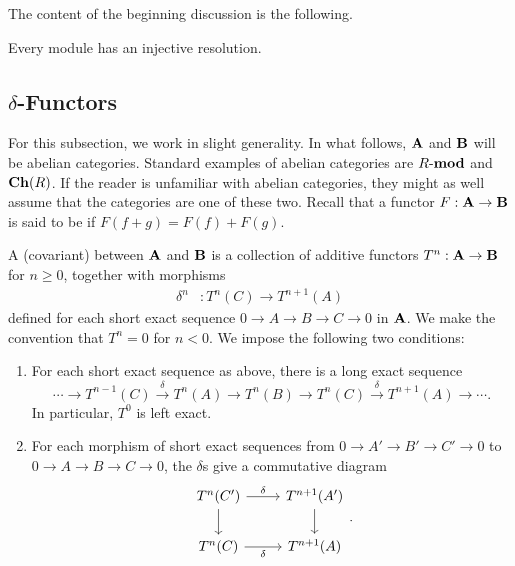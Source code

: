 \documentclass[12pt]{article}
\begin{document}
The content of the beginning discussion is the following.
\begin{prop}
	Every module has an injective resolution.
\end{prop}

\subsection{\texorpdfstring{$\delta$}{delta}-Functors}

For this subsection, we work in slight generality. In what follows, $\mathbf{A}$ and $\mathbf{B}$ will be abelian categories. Standard examples of abelian categories are $R\text{-}\mathbf{mod}$ and $\mathbf{Ch}(R)$. If the reader is unfamiliar with abelian categories, they might as well assume that the categories are one of these two. \newline
Recall that a functor $F : \mathbf{A} \to \mathbf{B}$ is said to be  if $F(f + g) = F(f) + F(g)$.

\begin{defn}
	A (covariant)  between $\mathbf{A}$ and $\mathbf{B}$ is a collection of additive functors $T^{n} : \mathbf{A} \to \mathbf{B}$ for $n \ge 0$, together with morphisms
	\begin{align*} 
		\delta^{n} &: T^{n}(C) \to T^{n + 1}(A)
	\end{align*}
	defined for each short exact sequence $0 \to A \to B \to C \to 0$ in $\mathbf{A}$. We make the convention that $T^{n} = 0$ for $n < 0$. We impose the following two conditions:
	\begin{enumerate}
		\item For each short exact sequence as above, there is a long exact sequence
		\begin{equation*} 
			\cdots \to T^{n - 1}(C) \xrightarrow{\delta} T^{n}(A) \to T^{n}(B) \to T^{n}(C) \xrightarrow{\delta} T^{n + 1}(A) \to \cdots.
		\end{equation*}
		In particular, $T^{0}$ is left exact.
		\item For each morphism of short exact sequences from $0 \to A' \to B' \to C' \to 0$ to $0 \to A \to B \to C \to 0$, the $\delta$s give a commutative diagram
		\begin{equation*} 
			\begin{tikzcd}
				T^{n}(C') \arrow[r, "\delta"] \arrow[d] & T^{n + 1}(A') \arrow[d] \\
				T^{n}(C) \arrow[r, "\delta"'] & T^{n + 1}(A)
			\end{tikzcd}.
		\end{equation*}
	\end{enumerate}
\end{defn}
\end{document}
